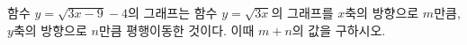 \hspace*{2mm}\begin{minipage}[t]{\dimexpr\linewidth-2mm\relax}\vspace{0pt}
함수 $y=\sqrt{3x-9}-4$의 그래프는 함수 $y=\sqrt{3x}$의 그래프를 $x$축의 방향으로 $m$만큼, $y$축의 방향으로 $n$만큼 평행이동한 것이다. 이때 $m+n$의 값을 구하시오.\end{minipage}
